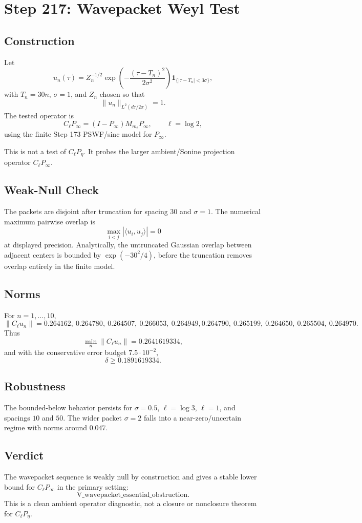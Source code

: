 \documentclass[11pt]{article}
\begin{document}
\section*{Step 217: Wavepacket Weyl Test}

\subsection*{Construction}

Let
\[
u_n(\tau)=Z_n^{-1/2}\exp\!\left(-\frac{(\tau-T_n)^2}{2\sigma^2}\right)
\mathbf 1_{\{|\tau-T_n|<3\sigma\}},
\]
with \(T_n=30n\), \(\sigma=1\), and \(Z_n\) chosen so that
\[
\|u_n\|_{L^2(d\tau/2\pi)}=1.
\]
The tested operator is
\[
C_\ell P_\infty=(I-P_\infty)M_{m_\ell}P_\infty,\qquad \ell=\log 2,
\]
using the finite Step 173 PSWF/sinc model for \(P_\infty\).

This is not a test of \(C_\ell P_\eta\).  It probes the larger ambient/Sonine projection operator \(C_\ell P_\infty\).

\subsection*{Weak-Null Check}

The packets are disjoint after truncation for spacing \(30\) and \(\sigma=1\).  The numerical maximum pairwise overlap is
\[
\max_{i<j}|\langle u_i,u_j\rangle|=0
\]
at displayed precision.  Analytically, the untruncated Gaussian overlap between adjacent centers is bounded by \(\exp(-30^2/4)\), before the truncation removes overlap entirely in the finite model.

\subsection*{Norms}

For \(n=1,\ldots,10\),
\[
\|C_\ell u_n\|=
0.264162,\ 0.264780,\ 0.264507,\ 0.266053,\ 0.264949,
0.264790,\ 0.265199,\ 0.264650,\ 0.265504,\ 0.264970.
\]
Thus
\[
\min_n\|C_\ell u_n\|=0.2641619334,
\]
and with the conservative error budget \(7.5\cdot 10^{-2}\),
\[
\delta\ge 0.1891619334.
\]

\subsection*{Robustness}

The bounded-below behavior persists for \(\sigma=0.5\), \(\ell=\log 3\), \(\ell=1\), and spacings \(10\) and \(50\).  The wider packet \(\sigma=2\) falls into a near-zero/uncertain regime with norms around \(0.047\).

\subsection*{Verdict}

The wavepacket sequence is weakly null by construction and gives a stable lower bound for \(C_\ell P_\infty\) in the primary setting:
\[
\boxed{\mathrm{V\_wavepacket\_essential\_obstruction}}.
\]
This is a clean ambient operator diagnostic, not a closure or nonclosure theorem for \(C_\ell P_\eta\).
\end{document}
